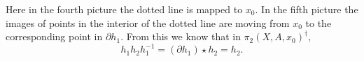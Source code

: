 \documentclass{article}
\begin{document}
Here in the fourth picture the dotted line is mapped to $x_0.$ In the fifth picture the images of points in the interior of the dotted line are moving from $x_0$ to the corresponding point in $\partial h_1.$ From this we know that in $\pi_2(X,A,x_0)^{\dagger},$
\[h_1h_2h_1^{-1}=(\partial h_1)\star h_2=h_2.\]
\end{document}
